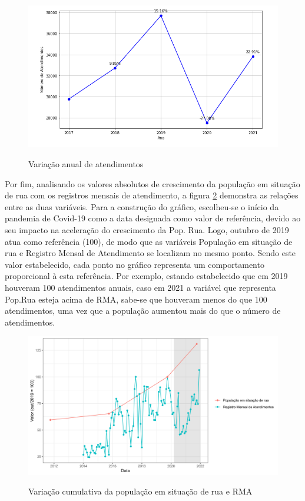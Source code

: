 \begin{figure}
    \centering
    \caption{Variação anual de atendimentos}
    \includegraphics[width = .9\linewidth]{relatorios/grupo2/figuras/variacaoanualatendimentos.png}
    \label{fig:variatend}
\end{figure}

Por fim, analisando os valores absolutos de crescimento da população em situação de rua com os registros mensais de atendimento, a figura \ref{fig:variacao} demonstra as relações entre as duas variáveis.
Para a construção do gráfico, escolheu-se o início da pandemia de Covid-19 como a data designada como valor de referência, devido ao seu impacto na aceleração do crescimento da Pop. Rua. Logo, outubro de 2019 atua como referência (100), de modo que as variáveis População em situação de rua e Registro Mensal de Atendimento se localizam no mesmo ponto. Sendo este valor estabelecido, cada ponto no gráfico representa um comportamento proporcional à esta referência. Por exemplo, estando estabelecido que em 2019 houveram 100 atendimentos anuais, caso em 2021 a variável que representa Pop.Rua esteja acima de RMA, sabe-se que houveram menos do que 100 atendimentos, uma vez que a população aumentou mais do que o número de atendimentos.  

\begin{figure}
    \centering
    \caption{Variação cumulativa da população em situação de rua e RMA}
    \includegraphics[width = .9\linewidth]{relatorios/grupo2/figuras/variacao.png}
    \label{fig:variacao}
\end{figure}

